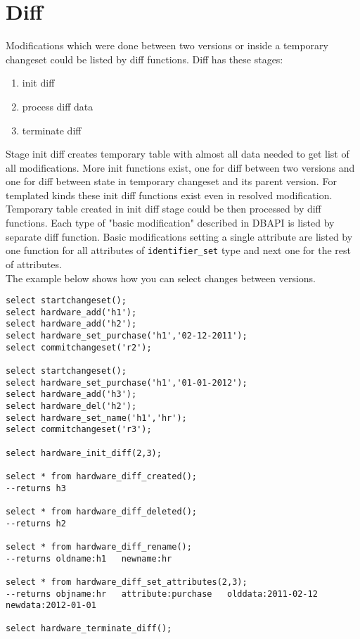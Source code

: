 \documentclass[deska]{subfiles}
\begin{document}
\section{Diff}
Modifications which were done between two versions or inside a temporary changeset could be listed by diff functions. Diff has these stages:
\begin{enumerate}
    \item init diff
    \item process diff data
    \item terminate diff
\end{enumerate}
Stage init diff creates temporary table with almost all data needed to get list of all modifications.
More init functions exist, one for diff between two versions and one for diff between state in temporary changeset and its parent version. For templated kinds these init diff functions exist even in resolved modification.\\
Temporary table created in init diff stage could be then processed by diff functions. Each type of "basic modification" described in DBAPI is listed by separate diff function. Basic modifications setting a single attribute are listed by one function for all attributes of {\tt identifier\_set} type and next one for the rest of attributes.\\
The example below shows how you can select changes between versions.

\begin{verbatim}
select startchangeset();
select hardware_add('h1');
select hardware_add('h2');
select hardware_set_purchase('h1','02-12-2011');
select commitchangeset('r2');

select startchangeset();
select hardware_set_purchase('h1','01-01-2012');
select hardware_add('h3');
select hardware_del('h2');
select hardware_set_name('h1','hr');
select commitchangeset('r3');

select hardware_init_diff(2,3);

select * from hardware_diff_created();
--returns h3

select * from hardware_diff_deleted();
--returns h2

select * from hardware_diff_rename();
--returns oldname:h1   newname:hr

select * from hardware_diff_set_attributes(2,3);
--returns objname:hr   attribute:purchase   olddata:2011-02-12   newdata:2012-01-01

select hardware_terminate_diff();
\end{verbatim}
\end{document}

